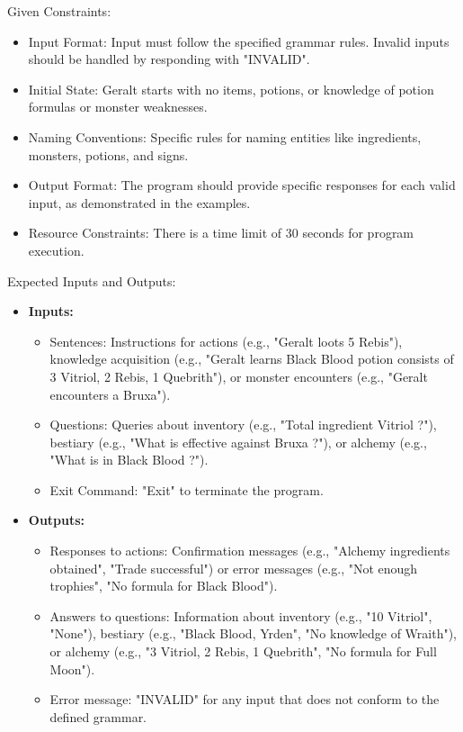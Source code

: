 \documentclass[12pt,a4paper]{article}
\begin{document}
Given Constraints:
\begin{itemize}
  \item Input Format: Input must follow the specified grammar rules. Invalid inputs should be handled by responding with "INVALID".
  \item Initial State: Geralt starts with no items, potions, or knowledge of potion formulas or monster weaknesses.
  \item Naming Conventions: Specific rules for naming entities like ingredients, monsters, potions, and signs.
  \item Output Format: The program should provide specific responses for each valid input, as demonstrated in the examples.
  \item Resource Constraints: There is a time limit of 30 seconds for program execution.
\end{itemize}

Expected Inputs and Outputs:
\begin{itemize}
  \item \textbf{Inputs:}
    \begin{itemize}
      \item Sentences: Instructions for actions (e.g., "Geralt loots 5 Rebis"), knowledge acquisition (e.g., "Geralt learns Black Blood potion consists of 3 Vitriol, 2 Rebis, 1 Quebrith"), or monster encounters (e.g., "Geralt encounters a Bruxa").
      \item Questions: Queries about inventory (e.g., "Total ingredient Vitriol ?"), bestiary (e.g., "What is effective against Bruxa ?"), or alchemy (e.g., "What is in Black Blood ?").
      \item Exit Command: "Exit" to terminate the program.
    \end{itemize}
  \item \textbf{Outputs:}
    \begin{itemize}
      \item Responses to actions: Confirmation messages (e.g., "Alchemy ingredients obtained", "Trade successful") or error messages (e.g., "Not enough trophies", "No formula for Black Blood").
      \item Answers to questions: Information about inventory (e.g., "10 Vitriol", "None"), bestiary (e.g., "Black Blood, Yrden", "No knowledge of Wraith"), or alchemy (e.g., "3 Vitriol, 2 Rebis, 1 Quebrith", "No formula for Full Moon").
      \item Error message: "INVALID" for any input that does not conform to the defined grammar.
    \end{itemize}
\end{itemize}
\end{document}
